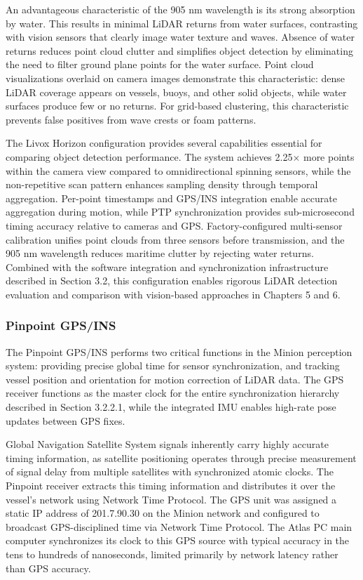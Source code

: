 \documentclass{erauthesis}
\begin{document}
An advantageous characteristic of the 905 nm wavelength is its strong absorption by water.
This results in minimal \ac{LiDAR} returns from water surfaces, contrasting with vision sensors that clearly image water texture and waves.
Absence of water returns reduces point cloud clutter and simplifies object detection by eliminating the need to filter ground plane points for the water surface.
Point cloud visualizations overlaid on camera images demonstrate this characteristic: dense \ac{LiDAR} coverage appears on vessels, buoys, and other solid objects, while water surfaces produce few or no returns.
For grid-based clustering, this characteristic prevents false positives from wave crests or foam patterns.

The Livox Horizon configuration provides several capabilities essential for comparing object detection performance.
The system achieves 2.25× more points within the camera view compared to omnidirectional spinning sensors, while the non-repetitive scan pattern enhances sampling density through temporal aggregation.
Per-point timestamps and \ac{GPS}/\ac{INS} integration enable accurate aggregation during motion, while PTP synchronization provides sub-microsecond timing accuracy relative to cameras and \ac{GPS}.
Factory-configured multi-sensor calibration unifies point clouds from three sensors before transmission, and the 905 nm wavelength reduces maritime clutter by rejecting water returns.
Combined with the software integration and synchronization infrastructure described in Section 3.2, this configuration enables rigorous \ac{LiDAR} detection evaluation and comparison with vision-based approaches in Chapters 5 and 6.

            \subsubsection{Pinpoint GPS/INS}

The Pinpoint \ac{GPS}/\ac{INS} performs two critical functions in the Minion perception system: providing precise global time for sensor synchronization, and tracking vessel position and orientation for motion correction of \ac{LiDAR} data.
The \ac{GPS} receiver functions as the master clock for the entire synchronization hierarchy described in Section 3.2.2.1, while the integrated \ac{IMU} enables high-rate pose updates between \ac{GPS} fixes.

Global Navigation Satellite System signals inherently carry highly accurate timing information, as satellite positioning operates through precise measurement of signal delay from multiple satellites with synchronized atomic clocks.
The Pinpoint receiver extracts this timing information and distributes it over the vessel's network using Network Time Protocol.
The \ac{GPS} unit was assigned a static IP address of 201.7.90.30 on the Minion network and configured to broadcast \ac{GPS}-disciplined time via Network Time Protocol.
The Atlas PC main computer synchronizes its clock to this \ac{GPS} source with typical accuracy in the tens to hundreds of nanoseconds, limited primarily by network latency rather than \ac{GPS} accuracy.
\end{document}
